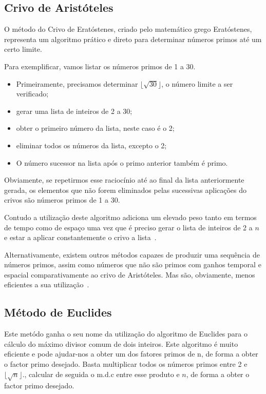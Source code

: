 \subsection{Crivo de Aristóteles}

O método do Crivo de Eratóstenes, criado pelo matemático grego Eratóstenes, representa um algoritmo prático e direto para determinar números primos até um certo limite. 

Para exemplificar, vamos listar os números primos de 1 a 30.

\begin{itemize}
    \item Primeiramente, precisamos determinar $\lfloor \sqrt{30} \rfloor$, o número limite a ser verificado;
    \item gerar uma lista de inteiros de 2 a 30;
    \item obter o primeiro número da lista, neste caso é o 2;
    \item eliminar todos os números da lista, excepto o 2;
    \item O número sucessor na lista após o primo anterior também é primo. 
\end{itemize}

Obviamente, se repetirmos esse raciocínio até ao final da lista anteriormente gerada, os elementos que não forem eliminados pelas sucessivas aplicações do crivos são números primos de 1 a 30.

Contudo a utilização deste algoritmo adiciona um elevado peso tanto em termos de tempo como de espaço uma vez que é preciso gerar o lista de inteiros de 2 a $n$ e estar a aplicar constantemente o crivo a lista~\cite{Quaresma2009a}.

Alternativamente, existem outros métodos capazes de produzir uma sequência de números primos, assim como números que não são primos com ganhos temporal e espacial comparativamente ao crivo de Aristóteles. Mas são, obviamente, menos eficientes a sua utilização~\cite{Quaresma2009a}.

\subsection{Método de Euclides}


Este metódo ganha o seu nome da utilização do algoritmo de Euclides para o cálculo do máximo divisor comum de dois inteiros. Este algoritmo é muito eficiente e pode ajudar-nos a obter um dos fatores primos de n, de forma a obter o factor primo desejado. Basta multiplicar todos os números primos entre 2 e $\lfloor \sqrt{n} \rfloor$., calcular de seguida o m.d.c entre esse produto e $n$, de forma a obter o factor primo desejado.

